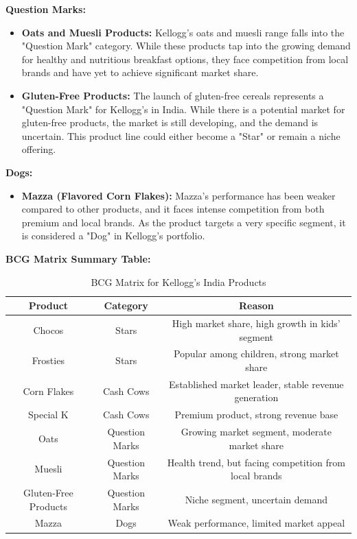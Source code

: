 \documentclass[10pt,a4paper]{book}
\begin{document}
\vspace{0.5cm}

\textbf{Question Marks:}
\begin{itemize}
    \item \textbf{Oats and Muesli Products:} Kellogg’s oats and muesli range falls into the "Question Mark" category. While these products tap into the growing demand for healthy and nutritious breakfast options, they face competition from local brands and have yet to achieve significant market share.
    \item \textbf{Gluten-Free Products:} The launch of gluten-free cereals represents a "Question Mark" for Kellogg’s in India. While there is a potential market for gluten-free products, the market is still developing, and the demand is uncertain. This product line could either become a "Star" or remain a niche offering.
\end{itemize}

\vspace{0.5cm}

\textbf{Dogs:}
\begin{itemize}
    \item \textbf{Mazza (Flavored Corn Flakes):} Mazza’s performance has been weaker compared to other products, and it faces intense competition from both premium and local brands. As the product targets a very specific segment, it is considered a "Dog" in Kellogg's portfolio.
\end{itemize}

\vspace{0.5cm}

\textbf{BCG Matrix Summary Table:}

\begin{table}[H]
\centering
\begin{tabular}{|c|c|c|}
\hline
\textbf{Product} & \textbf{Category} & \textbf{Reason} \\ \hline
Chocos & Stars & High market share, high growth in kids' segment \\ \hline
Frosties & Stars & Popular among children, strong market share \\ \hline
Corn Flakes & Cash Cows & Established market leader, stable revenue generation \\ \hline
Special K & Cash Cows & Premium product, strong revenue base \\ \hline
Oats & Question Marks & Growing market segment, moderate market share \\ \hline
Muesli & Question Marks & Health trend, but facing competition from local brands \\ \hline
Gluten-Free Products & Question Marks & Niche segment, uncertain demand \\ \hline
Mazza & Dogs & Weak performance, limited market appeal \\ \hline
\end{tabular}
\caption{BCG Matrix for Kellogg’s India Products}
\end{table}
\end{document}
